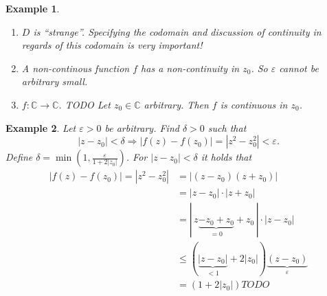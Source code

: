 \documentclass[a4paper,landscape,twocolumn]{article}
\newtheorem{ex}{Example}
\newcommand\abs[1]{\left|#1\right|}
\begin{document}
\begin{ex}
  \begin{enumerate}
    \item $D$ is \enquote{strange}.
      Specifying the codomain and discussion of continuity in regards of this codomain is very important!
    \item A non-continous function
      $f$ has a non-continuity in $z_0$.
      So $\varepsilon$ cannot be arbitrary small.
    \item
      $f: \mathbb C \rightarrow \mathbb C$. TODO
      Let $z_0 \in \mathbb C$ arbitrary. Then $f$ is continuous in $z_0$.
  \end{enumerate}
\end{ex}
%
\begin{ex}
  Let $\varepsilon > 0$ be arbitrary. Find $\delta > 0$ such that
  \[ \abs{z - z_0} < \delta \Rightarrow \abs{f(z) - f(z_0)} = \abs{z^2 - z_0^2} < \varepsilon. \]
  Define $\delta = \min\left(1, \frac{\varepsilon}{1 + 2\abs{z_0}}\right)$.
  For $\abs{z - z_0} < \delta$ it holds that
  \begin{align*}
    \abs{f(z) - f(z_0)} = \abs{z^2 - z_0^2}
    &= \abs{(z - z_0) (z + z_0)} \\
    &= \abs{z - z_0} \cdot \abs{z + z_0} \\
    &= |\, z \underbrace{- z_0 + z_0}_{=0} + z_0\,| \cdot \abs{z - z_0} \\
    &\leq (\underbrace{\abs{z - z_0}}_{<1} + 2 \abs{z_0}) \underbrace{(z - z_0)}_{\varepsilon} \\
    &= \left(1 + 2 \abs{z_0}\right) TODO
  \end{align*}
\end{ex}
%
\end{document}
